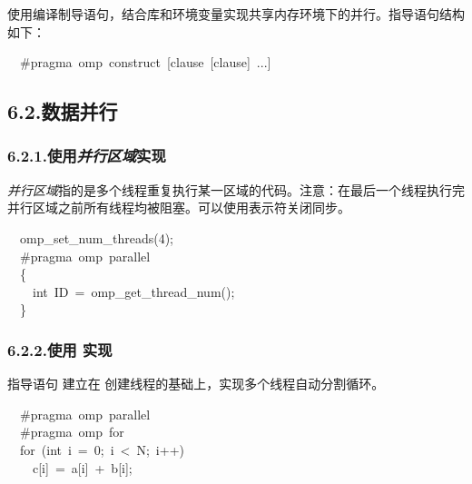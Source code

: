 \documentclass{article}
\begin{document}
\noindent{}使用编译制导语句，结合库和环境变量实现共享内存环境下的并行。指导语句结构如下：%
\begin{mdpre}%
\noindent~~\#pragma~omp~construct~[clause~[clause]~...]%
\end{mdpre}
\subsection{6.2.\hspace*{0.5em}数据并行}\label{section}%

\subsubsection{6.2.1.\hspace*{0.5em}使用\emph{并行区域}实现}\label{sec---}%

\noindent{}\emph{并行区域}指的是多个线程重复执行某一区域的代码。注意：在最后一个线程执行完并行区域之前所有线程均被阻塞。可以使用表示符关闭同步。%
\begin{mdpre}%
\noindent~~omp\_set\_num\_threads({4});\\
~~\#pragma~omp~parallel\\
~~\{\\
~~~~{int}~{ID}~=~omp\_get\_thread\_num();\\
~~\}%
\end{mdpre}
\subsubsection{6.2.2.\hspace*{0.5em}使用 实现}\label{sec--pragma-omp-for}%

\noindent{}指导语句 建立在 创建线程的基础上，实现多个线程自动分割循环。%
\begin{mdpre}%
\noindent~~\#pragma~omp~parallel\\
~~\#pragma~omp~{for}\\
~~{for}~({int}~i~=~{0};~i~\textless{}~{N};~i++)\\
~~~~c[i]~=~a[i]~+~b[i];%
\end{mdpre}
\end{document}
